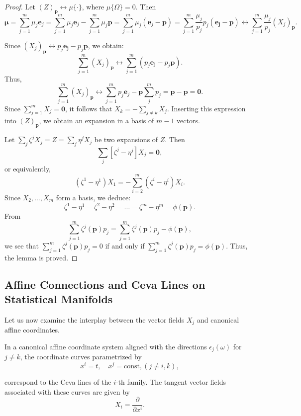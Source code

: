 \begin{proof}
Let $(Z)_{\mathbf{p}} \leftrightarrow \mu\{\cdot\}$, where $\mu\{\Omega\}=0$. Then
\[
\mathbf{\mu} = \sum_{j=1}^m \mu_j \mathbf{e}_j = \sum_{j=1}^m \mu_j \mathbf{e}_j - \sum_{j=1}^m \mu_j \mathbf{p} 
= \sum_{j=1}^m \mu_j (\mathbf{e}_j - \mathbf{p}) 
= \sum_{j=1}^m \frac{\mu_j}{p_j} p_j(\mathbf{e_j} - \mathbf{p})
\longleftrightarrow  \sum_{j=1}^m \frac{\mu_j}{p_j}(X_j)_{\mathbf{p}}.
\]

Since $(X_j)_{\mathbf{p}} \longleftrightarrow  p_j \mathbf{e_j} - p_j \mathbf{p}$, we obtain:
\[
\sum _{j=1}^m (X_j)_{\mathbf{p}} \longleftrightarrow  \sum_{j=1}^m  (p_j\mathbf{e_j} - p_j \mathbf{p}).
\]
Thus,
\[
\sum_{j=1}^m (X_j)_{\mathbf{p}}  \longleftrightarrow \sum_{j=1}^m p_j {\mathbf{e}_j} - \mathbf{p}\sum_j^m p_j 
  = \mathbf{p} -\mathbf{p} = \mathbf{0}.
\]
Since $\sum_{j=1}^m X_j = {\mathbf{0}}$, it follows that $X_k = - \sum\limits_{j \neq k} X_j$. Inserting this expression into $(Z)_{\mathbf{p}}$, we obtain an expansion in a basis of $m-1$ vectors.

Let $\sum\limits_j \zeta^j X_j = Z = \sum\limits_j \eta^j X_j$ be two expansions of $Z$. Then
\[
\sum_j[\zeta^j - \eta^j]X_j =\mathbf{0},
\]
or equivalently,
\[
(\zeta^1 - \eta^1)X_1 = - \sum_{i=2}^m (\zeta ^i - \eta^i)X_i.
\]
Since $X_2,\dots,X_m$ form a basis, we deduce:
\[
\zeta^1 - \eta^1 = \zeta^2 - \eta^2 =\dots= \zeta^m - \eta ^m = \phi(\mathbf{p}).
\]
From
\[
\sum_{j=1}^m \zeta^j (\mathbf{p})p_j = \sum_{j=1}^m \zeta^j(\mathbf{p})p_j - \phi(\mathbf{p}),
\]
we see that $\sum_{j=1}^m \zeta^j(\mathbf{p}) p_j=0$ if and only if $ \sum_{j=1}^m\zeta^j (\mathbf{p}) p_j = \phi(\mathbf{p})$.
Thus, the lemma is proved.
\end{proof}

\subsection{Affine Connections and Ceva Lines on Statistical Manifolds}

Let us now examine the interplay between the vector fields $X_j$ and canonical affine coordinates.


\begin{lemma}
In a canonical affine coordinate system aligned with the directions $\epsilon_j(\omega)$ for $j\neq k$, the coordinate curves parametrized by 
\[x^i= t,\quad  x^j = \text{const}, (j \neq i, k),\]

correspond to the Ceva lines of the $i$-th family. The tangent vector fields associated with these curves are given by \[X_i = \frac{\partial}{\partial x^i}.\]
\end{lemma}

